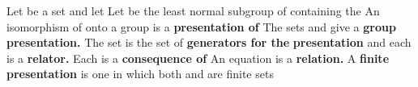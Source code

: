 \documentclass[11pt,oneside]{article}
\begin{document}
\begin{BookBody}
 Let  be a set and let  Let  be the least normal subgroup of  containing the  An isomorphism \BookInline{\phi } of  onto a group  is a\textbf{ presentation of}  The 
sets  and  give a\textbf{ group presentation.} The set  is the set of\textbf{ generators for the} \textbf{presentation} and each  is a\textbf{ relator.} Each  is a\textbf{ consequence of}  An equation  is a\textbf{ relation.} A\textbf{ finite presentation} is one in which both  and  are finite sets\BookEnd{\blacksquare}

\end{BookBody}

\BookNarrativetrue
\end{document}
